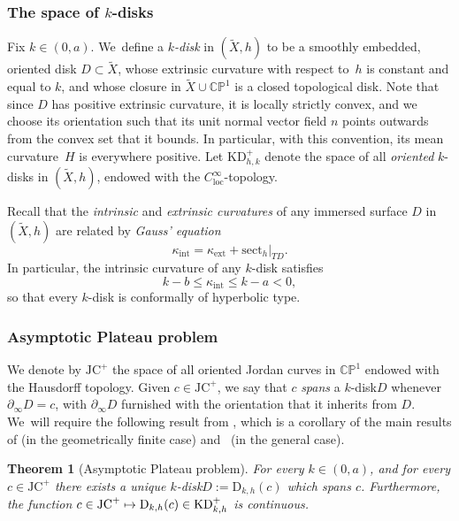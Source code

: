 \documentclass[10pt]{amsart}
\newcommand\mto{\mathchoice{\longmapsto}{\mapsto}{\mapsto}{\mapsto}}
\newcommand{\kdisk}{$k$\nobreakdash-disk\xspace}
\newcommand{\kdisks}{$k$\nobreakdash-disks\xspace}
\newcommand{\intt}{\mathrm{int}}
\newcommand{\ext}{\mathrm{ext}}
\theoremstyle{plain}
\newtheorem{theorem}{Theorem}[section]
\theoremstyle{definition}
\newcommand\CP{\C\PP^1}
\newcommand{\C}{{\mathbb C}}
\newcommand{\PP}{{\mathbb P}}
\let\dans\subset
\newcommand{\loc}{\mathrm{loc}}
\newcommand{\sect}{\mathrm{sect}}
\newcommand{\KD}{\mathrm{KD}}
\newcommand{\JC}{\mathrm{JC}}
\newcommand{\rD}{\mathrm{D}}
\newcommand{\bord}{\partial_{\infty}}
\begin{document}
\subsubsection{The space of $k$-disks}\label{sss.space_k_discs}
Fix $k\in(0,a)$. We~define a \emph{\kdisk} in $(\tilde{X},h)$ to be a smoothly embedded, oriented disk $D\dans \tilde{X}$, whose extrinsic curvature with respect to~$h$ is constant and equal to $k$, and whose closure in $\tilde{X}\cup\CP$ is a closed topological disk. Note that since $D$ has positive extrinsic curvature, it is locally strictly convex, and we choose its orientation such that its unit normal vector field $n$ points outwards from the convex set that it bounds. In particular, with this convention, its mean curvature~$H$ is everywhere positive. Let $\KD^+_{h,k}$ denote the space of all \emph{oriented} \kdisks in $(\tilde{X},h)$, endowed with the $C^\infty_{\loc}$-topology.

Recall that the \emph{intrinsic} and \emph{extrinsic curvatures} of any immersed surface $D$ in $(\tilde{X},h)$ are related by \emph{Gauss' equation}
\begin{equation}
\kappa_{\intt}=\kappa_{\ext}+\sect_h|_{TD}.
\end{equation}
In particular, the intrinsic curvature of any \kdisk satisfies
\begin{equation}\label{eq_intr_curv}
k-b\leq\kappa_{\intt}\leq k-a<0,
\end{equation}
so that every \kdisk is conformally of hyperbolic type.

\subsubsection{Asymptotic Plateau problem}\label{sss.asymptotic_Plateau_problem} We denote by $\JC^+$ the space of all oriented Jordan curves in $\CP$ endowed with the Hausdorff topology. Given $c\in\JC^+$, we say that $c$ \emph{spans} a \kdisk $D$ whenever $\bord D=c$, with $\bord D$ furnished with the orientation that it inherits from $D$. We~will require the following result from \cite[Th.\,\&\,Def.\,2.1.1]{ALS}, which is a corollary of the main results of \cite{LabourieInvent} (in the geometrically finite case) and~\cite{Smith_asymp} (in the general case).

\begin{theorem}[Asymptotic Plateau problem]\label{th.As_plateau_problem}
For every $k\in(0,a)$, and for every $c\in\JC^+$ there exists a unique \kdisk $D:=\rD_{k,h}(c)$ which spans $c$. Furthermore, the function $c\in\JC^+\mto\rD_{k,h}(c)\in\KD^+_{k,h}$ is continuous.
\end{theorem}
\end{document}
